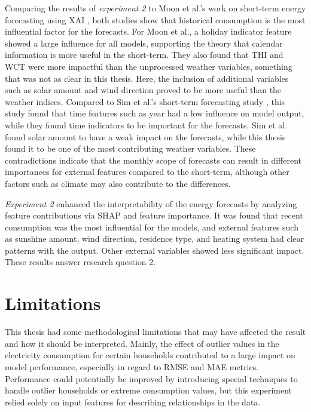 Comparing the results of \emph{experiment 2} to Moon et al.'s work on short-term energy forecasting using XAI \cite{moon_advancing_2024}, both studies show that historical consumption is the most influential factor for the forecasts. For Moon et al., a holiday indicator feature showed a large influence for all models, supporting the theory that calendar information is more useful in the short-term. They also found that THI and WCT were more impactful than the unprocessed weather variables, something that was not as clear in this thesis. Here, the inclusion of additional variables such as solar amount and wind direction proved to be more useful than the weather indices. Compared to Sim et al.'s short-term forecasting study \cite{sim_explainable_2022}, this study found that time features such as year had a low influence on model output, while they found time indicators to be important for the forecasts. Sim et al. found solar amount to have a weak impact on the forecasts, while this thesis found it to be one of the most contributing weather variables. These contradictions indicate that the monthly scope of forecasts can result in different importances for external features compared to the short-term, although other factors such as climate may also contribute to the differences.

\emph{Experiment 2} enhanced the interpretability of the energy forecasts by analyzing feature contributions via SHAP and feature importance. It was found that recent consumption was the most influential for the models, and external features such as sunshine amount, wind direction, residence type, and heating system had clear patterns with the output. Other external variables showed less significant impact. These results answer research question 2.

\section{Limitations}

This thesis had some methodological limitations that may have affected the result and how it should be interpreted. Mainly, the effect of outlier values in the electricity consumption for certain households contributed to a large impact on model performance, especially in regard to RMSE and MAE metrics. Performance could potentially be improved by introducing special techniques to handle outlier households or extreme consumption values, but this experiment relied solely on input features for describing relationships in the data.

